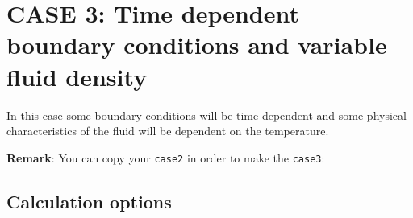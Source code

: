 
%
%
%
%


\newpage
\section{CASE 3:  Time dependent boundary conditions and variable fluid density}
In this case some boundary conditions will be time dependent and some physical
characteristics of the fluid will be dependent on the temperature.

\textbf{Remark}: You can copy your \texttt{case2} in order to make the \texttt{case3}:\\

        \subsection{Calculation options}

